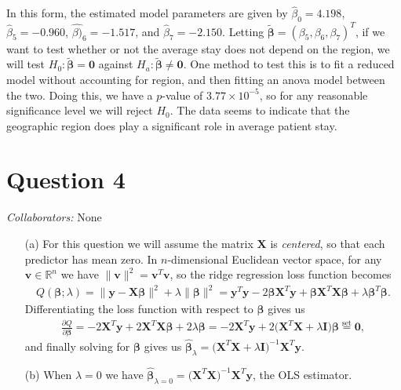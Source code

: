\documentclass[10pt]{article}
\newcommand{\mycolaba}[1]{\textcolor{colabcol}{\textsl{Collaborators:}} #1}
\begin{document}
\begin{itemize}
    In this form, the estimated model parameters are given by \(\hat{\beta}_0 = 4.198\), \(\hat{\beta}_5 = - 0.960\), \(\hat{\beta)}_6 = -1.517\), and 
    \(\hat{\beta}_7 = -2.150\). Letting \(\tilde{\bm{\beta}} = (\beta_5, \beta_6, \beta_7)^T\), if we want to test whether or not the average stay does not 
    depend on the region, we will test \(H_0 : \tilde{\bm{\beta}} = \mathbf{0}\) against \(H_a : \tilde{\bm{\beta}} \neq \mathbf{0}\). One method to test this 
    is to fit a reduced model without accounting for region, and then fitting an anova model between the two. Doing this, we have a \(p\)-value of 
    \(3.77 \times 10^{-5}\), so for any reasonable significance level we will reject \(H_0\). The data seems to indicate that the geographic region does play 
    a significant role in average patient stay. 
\end{itemize}


\section{Question 4} \noindent
\mycolaba{None}
\begin{itemize}
    \item[(a)] For this question we will assume the matrix \(\mathbf{X}\) is \textsl{centered}, so that each predictor has mean zero. 
    In \(n\)-dimensional Euclidean vector space, for any \(\mathbf{v} \in \mathbb{R}^n\) we have \(\|\mathbf{v}\|^2 = \mathbf{v}^T\mathbf{v}\), 
    so the ridge regression loss function becomes 
    \begin{align*}
        Q(\bm{\beta}; \lambda) 
        = \| \mathbf{y} - \mathbf{X}\bm{\beta} \|^2 + \lambda \|\bm{\beta}\|^2
        = \mathbf{y}^T\mathbf{y} - 2 \bm{\beta}\mathbf{X}^T\mathbf{y} + \bm{\beta} \mathbf{X}^T \mathbf{X} \bm{\beta} + \lambda \bm{\beta}^T \bm{\beta}.
    \end{align*}
    Differentiating the loss function with respect to \(\bm{\beta}\) gives us 
    \begin{align*}
        \frac{\partial Q}{\partial \bm{\beta}}
        = -2 \mathbf{X}^T \mathbf{y} + 2 \mathbf{X}^T\mathbf{X}\bm{\beta} + 2 \lambda \bm{\beta}
        = -2 \mathbf{X}^T \mathbf{y} + 2 \big( \mathbf{X}^T\mathbf{X} + \lambda \mathbf{I} \big) \bm{\beta}
        \overset{\text{set}}{=} \mathbf{0},
    \end{align*}
    and finally solving for \(\bm{\beta}\) gives us 
    \(\hat{\bm{\beta}}_{\lambda} = \big( \mathbf{X}^T\mathbf{X} + \lambda \mathbf{I} \big)^{-1} \mathbf{X}^T\mathbf{y}\).
    \item[(b)] When \(\lambda = 0\) we have \(\hat{\bm{\beta}}_{\lambda = 0} = \big( \mathbf{X}^T\mathbf{X} \big)^{-1} \mathbf{X}^T\mathbf{y}\), the OLS 
    estimator. 
\end{itemize}
\end{document}
